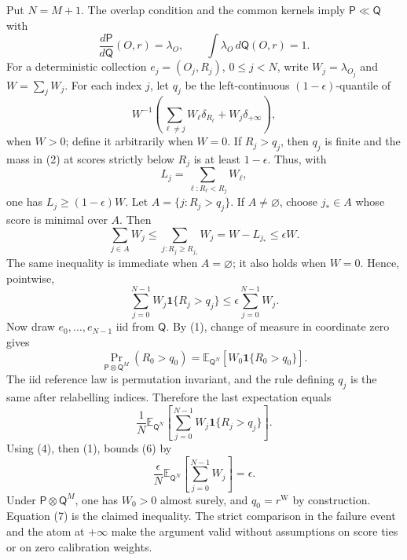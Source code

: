 Put \(N=M+1\). The overlap condition and the common kernels imply \(\mathsf P\ll\mathsf Q\) with
\[
\frac{d\mathsf P}{d\mathsf Q}(O,r)=\lambda_O,
\qquad \int\lambda_O\,d\mathsf Q(O,r)=1.
\tag{1}
\]
For a deterministic collection \(e_j=(O_j,R_j)\), \(0\le j<N\), write \(W_j=\lambda_{O_j}\) and \(W=\sum_jW_j\). For each index \(j\), let \(q_j\) be the left-continuous \((1-\epsilon)\)-quantile of
\[
W^{-1}\left(\sum_{\ell\ne j}W_\ell\delta_{R_\ell}+W_j\delta_{+\infty}\right),
\tag{2}
\]
when \(W>0\); define it arbitrarily when \(W=0\). If \(R_j>q_j\), then \(q_j\) is finite and the mass in (2) at scores strictly below \(R_j\) is at least \(1-\epsilon\). Thus, with
\[
L_j=\sum_{\ell:R_\ell<R_j}W_\ell,
\]
one has \(L_j\ge(1-\epsilon)W\). Let \(A=\{j:R_j>q_j\}\). If \(A\ne\varnothing\), choose \(j_*\in A\) whose score is minimal over \(A\). Then
\[
\sum_{j\in A}W_j\le\sum_{j:R_j\ge R_{j_*}}W_j=W-L_{j_*}\le\epsilon W.
\tag{3}
\]
The same inequality is immediate when \(A=\varnothing\); it also holds when \(W=0\). Hence, pointwise,
\[
\sum_{j=0}^{N-1}W_j\mathbf 1\{R_j>q_j\}\le\epsilon\sum_{j=0}^{N-1}W_j.
\tag{4}
\]
Now draw \(e_0,\ldots,e_{N-1}\) iid from \(\mathsf Q\). By (1), change of measure in coordinate zero gives
\[
\Pr_{\mathsf P\otimes\mathsf Q^M}(R_0>q_0)=\mathbb E_{\mathsf Q^N}\!\left[W_0\mathbf 1\{R_0>q_0\}\right].
\tag{5}
\]
The iid reference law is permutation invariant, and the rule defining \(q_j\) is the same after relabelling indices. Therefore the last expectation equals
\[
\frac1N\mathbb E_{\mathsf Q^N}\!\left[\sum_{j=0}^{N-1}W_j\mathbf 1\{R_j>q_j\}\right].
\tag{6}
\]
Using (4), then (1), bounds (6) by
\[
\frac{\epsilon}{N}\mathbb E_{\mathsf Q^N}\!\left[\sum_{j=0}^{N-1}W_j\right]=\epsilon.
\tag{7}
\]
Under \(\mathsf P\otimes\mathsf Q^M\), one has \(W_0>0\) almost surely, and \(q_0=r^{\mathrm W}\) by construction. Equation (7) is the claimed inequality. The strict comparison in the failure event and the atom at \(+\infty\) make the argument valid without assumptions on score ties or on zero calibration weights.